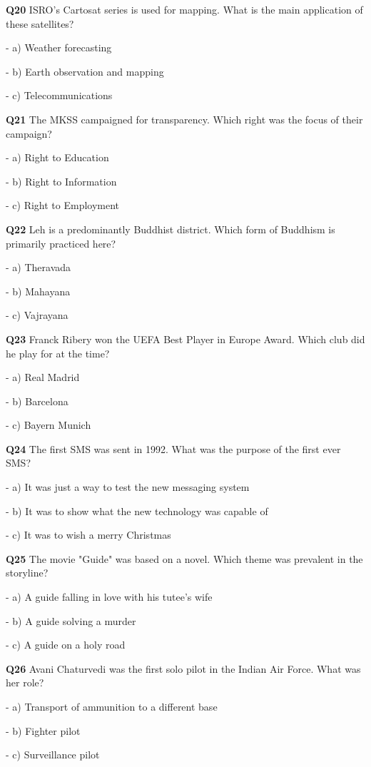 \textbf{Q20} ISRO's Cartosat series is used for mapping. What is the main application of these satellites?\par
\quad - a) Weather forecasting\par
\quad - b) Earth observation and mapping\par
\quad - c) Telecommunications\par

\textbf{Q21} The MKSS campaigned for transparency. Which right was the focus of their campaign?\par
\quad - a) Right to Education\par
\quad - b) Right to Information\par
\quad - c) Right to Employment\par

\textbf{Q22} Leh is a predominantly Buddhist district. Which form of Buddhism is primarily practiced here?\par
\quad - a) Theravada\par
\quad - b) Mahayana\par
\quad - c) Vajrayana\par

\textbf{Q23} Franck Ribery won the UEFA Best Player in Europe Award. Which club did he play for at the time?\par
\quad - a) Real Madrid\par
\quad - b) Barcelona\par
\quad - c) Bayern Munich\par

\textbf{Q24} The first SMS was sent in 1992. What was the purpose of the first ever SMS?\par
\quad - a) It was just a way to test the new messaging system\par
\quad - b) It was to show what the new technology was capable of\par
\quad - c) It was to wish a merry Christmas\par

\textbf{Q25} The movie "Guide" was based on a novel. Which theme was prevalent in the storyline?\par
\quad - a) A guide falling in love with his tutee's wife\par
\quad - b) A guide solving a murder\par
\quad - c) A guide on a holy road\par

\textbf{Q26} Avani Chaturvedi was the first solo pilot in the Indian Air Force. What was her role?\par
\quad - a) Transport of ammunition to a different base\par
\quad - b) Fighter pilot\par
\quad - c) Surveillance pilot\par

